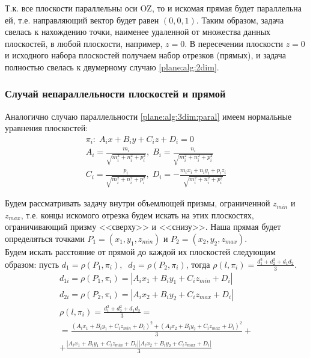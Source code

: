 Т.к. все плоскости параллельны оси OZ, то и искомая прямая будет параллельна ей, т.е. направляющий вектор будет равен $(0,0,1)$. Таким образом, задача свелась к нахождению точки, наименее удаленной от множества данных плоскостей, в любой плоскости, например, $z = 0$. В пересечении плоскости $z=0$ и исходного набора плоскостей получаем набор отрезков (прямых), и задача полностью свелась к двумерному случаю \ref{plane:alg:2dim}.

\subsubsection{Случай непараллельности плоскостей и прямой}\label{plane:alg:3dim:neparal}

Аналогично случаю параллельности \ref{plane:alg:3dim:paral} имеем нормальные уравнения плоскостей:
$$\begin{gathered}
	\pi_i: \; A_i x + B_i y + C_i z + D_i = 0 \\
	A_i = \frac{m_i}{\sqrt{m_i^2 + n_i^2 + p_i^2}}, \;
	B_i = \frac{n_i}{\sqrt{m_i^2 + n_i^2 + p_i^2}} \\
	C_i = \frac{p_i}{\sqrt{m_i^2 + n_i^2 + p_i^2}}, \;
	D_i = -\frac{m_i x_i + n_i y_i + p_i z_i}{\sqrt{m_i^2 + n_i^2 + p_i^2}}
\end{gathered}$$

Будем рассматривать задачу внутри объемлющей призмы, ограниченной $z_{min}$ и $z_{max}$, т.е. концы искомого отрезка будем искать на этих плоскостях, ограничивающий призму <<сверху>> и <<снизу>>. Наша прямая будет определяться точками $P_1 = (x_1, y_1, z_{min})$ и $P_2 = (x_2, y_2, z_{max})$.\\


Будем искать расстояние от прямой до каждой их плоскостей следующим образом: пусть $d_1 = \rho \left( P_1, \pi_i \right), \;\; d_2 = \rho \left( P_2, \pi_i \right)$, тогда $\rho (l, \pi_i) = \frac{d_1^2 + d_2^2 + d_1 d_2}{3}$.\\

$$\begin{gathered}
	d_{1i} = \rho \left( P_1, \pi_i \right) = |A_i x_1 + B_i y_1 + C_i z_{min} + D_i| \\
	d_{2i} = \rho \left( P_2, \pi_i \right) = |A_i x_2 + B_i y_2 + C_i z_{max} + D_i|\\
	\rho (l, \pi_i) = \frac{d_1^2 + d_2^2 + d_1 d_2}{3} = \\
	= \frac{\left( A_i x_1 + B_i y_1 + C_i z_{min} + D_i \right)^2 + \left( A_i x_2 + B_i y_2 + C_i z_{max} + D_i \right)^2}{3} + \\
	+ \frac{|A_i x_1 + B_i y_1 + C_i z_{min} + D_i||A_i x_2 + B_i y_2 + C_i z_{max} + D_i|}{3}
\end{gathered}$$

